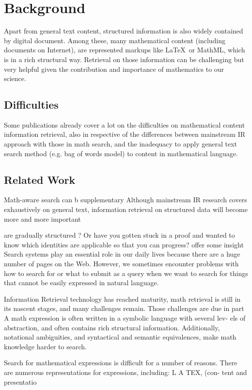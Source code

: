 \chapter{Background}
Apart from general text content, structured information is also widely contained by digital document. Among these, many mathematical content (including documents on Internet), are represented markups like \LaTeX\  or MathML, which is in a rich structural way. Retrieval on those information can be challenging but very helpful given the contribution and importance of mathematics to our science.

\section{Difficulties}
Some publications already cover a lot on the difficulties on mathematical content information retrieval, also in respective of the differences between mainstream IR approach with those in math search, and the inadequacy to apply general text search method (e.g. bag of words model) to content in mathematical language.

\section{Related Work}


Math-aware search can b
supplementary
Although mainstream IR research covers exhaustively on general text, information retrieval on structured data will become more and more important 

are gradually 
structured 
? Or have
you gotten stuck in a proof and wanted to know which identities
are applicable so that you can progress?
offer some insight 
Search systems play an essential role in our daily lives because there are
a huge number of pages on the Web. However, we sometimes encounter
problems with how to search for or what to submit as a query when we
want to search for things that cannot be easily expressed in natural language.

Information Retrieval technology has reached maturity, math retrieval is still in
its nascent stages, and many challenges remain. Those challenges are due in part
A math expression is often written in a symbolic language with several lev-
els of abstraction, and often contains rich structural information. Additionally,
notational ambiguities, and syntactical and semantic equivalences, make math
knowledge harder to search.

Search for mathematical expressions is difficult for a number of reasons.
There are numerous representations for expressions, including: L A TEX, (con-
tent and presentatio

